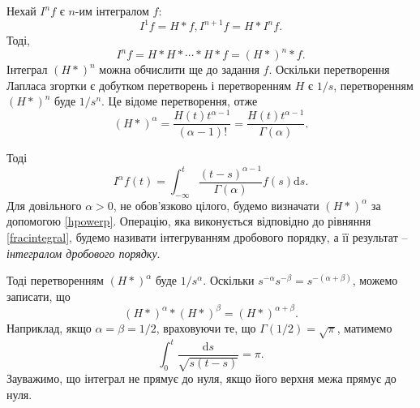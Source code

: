 \documentclass[14pt,twoside]{extreport}
\theoremstyle{mystyle}
\numberwithin{equation}{chapter}
\begin{document}
Нехай $I^n f$ є $n$-им інтегралом $f$:
\begin{equation}
I^1 f=H*f, I^{n+1} f=H*I^n f.
\end{equation}
Тоді,
\begin{equation}
I^n f=H*H*\cdots *H*f=(H*)^{n}*f.
\end{equation}
Інтеграл $(H*)^{n}$ можна обчислити ще до задання $f$. Оскільки перетворення Лапласа згортки є добутком перетворень і перетворенням $H$ є $1/s$, перетворенням $(H*)^{n}$ буде $1/s^{n}$. Це відоме перетворення, отже
\begin{equation}\label{hpowerp}
(H*)^{\alpha}=\dfrac{H(t)t^{\alpha-1}}{(\alpha-1)!}=\dfrac{H(t)t^{\alpha-1}}{\Gamma(\alpha)}.
\end{equation}

Тоді
\begin{equation}\label{fracintegral}
I^{\alpha} f(t)=\displaystyle \int_{-\infty}^{t}\dfrac{(t-s)^{\alpha-1}}{\Gamma(\alpha)}f(s)\mathrm{d}s.
\end{equation}
Для довільного $\alpha>0$, не обов'язково цілого, будемо визначати $(H*)^{\alpha}$ за допомогою \eqref{hpowerp}. Операцію, яка виконується відповідно до рівняння \eqref{fracintegral}, будемо називати інтегруванням дробового порядку, а її результат -- \emph{інтегралом дробового порядку}.

Тоді перетворенням $(H*)^{\alpha}$ буде $1/s^{\alpha}$. Оскільки $s^{-\alpha}s^{-\beta}=s^{-(\alpha+\beta)}$, можемо записати, що
\begin{equation}
(H*)^{\alpha}*(H*)^{\beta}=(H*)^{\alpha+\beta}.
\end{equation}
Наприклад, якщо $\alpha=\beta=1/2$, враховуючи те, що $\Gamma(1/2)=\sqrt{\pi}$, матимемо
\begin{equation}
\displaystyle \int_{0}^{t}\frac{\mathrm{d}s}{\sqrt{s(t-s)}}=\pi.
\end{equation}
Зауважимо, що інтеграл не прямує до нуля, якщо його верхня межа прямує до нуля.
\end{document}
